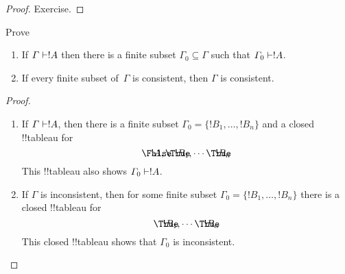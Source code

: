 \documentclass[../../../include/open-logic-section]{subfiles}
\begin{document}
\begin{proof}
Exercise.
\end{proof}

\begin{prob}
Prove 
\end{prob}

\begin{prop}[Compactness]
  \begin{enumerate}
  \item If $\Gamma \Proves !A$ then there is a finite subset $\Gamma_0
    \subseteq \Gamma$ such that $\Gamma_0 \Proves !A$.
  \item If every finite subset of~$\Gamma$ is
    consistent, then $\Gamma$ is consistent.
  \end{enumerate}
\end{prop}

\begin{proof}
  \begin{enumerate}
    \item If $\Gamma \Proves !A$, then there is a finite subset
      $\Gamma_0 = \{!B_1, \dots, !B_n\}$ and a closed !!{tableau} for
      \[
      \sFmla{\False}{!A}, \sFmla{\True}{!B_1}, \dotsm \sFmla{\True}{!B_n}
      \]
      This !!{tableau} also shows $\Gamma_0 \Proves !A$.
    \item If $\Gamma$ is inconsistent, then for some finite subset
      $\Gamma_0 = \{!B_1, \dots, !B_n\}$ there is a closed !!{tableau}
      for
      \[
      \sFmla{\True}{!B_1}, \dotsm \sFmla{\True}{!B_n}
      \]
      This closed !!{tableau} shows that $\Gamma_0$ is inconsistent.
  \end{enumerate}
\end{proof}
\end{document}
